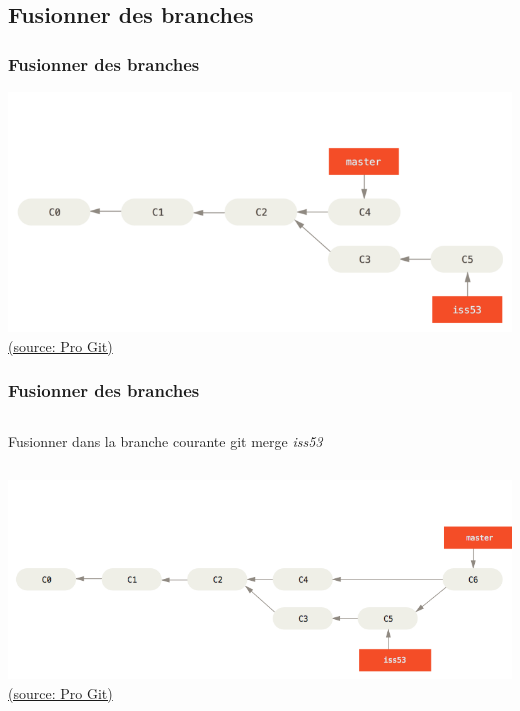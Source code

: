\documentclass[t,11pt]{beamer}
\begin{document}
\subsection{Fusionner des branches}

\begin{frame}
        \frametitle{Fusionner des branches}
        \centering
        \includegraphics[width=\linewidth,height=0.8\textheight,keepaspectratio]{./img/basic-branching-6}
        \newline
        \href{https://git-scm.com/book/fr/v1/Les-branches-avec-Git-Ce-qu-est-une-branche}{{\tiny (source: Pro Git)}}
\end{frame}

\begin{frame}
        \frametitle{Fusionner des branches}
        \begin{columns}
                \begin{block}{Fusionner dans la branche courante}
                        git merge \emph{iss53}
                \end{block}
        \end{columns}
        \vspace{-5mm}
        \centering
        \includegraphics[width=\linewidth,height=0.8\textheight,keepaspectratio]{./img/basic-merging-2}
        \newline
        \href{https://git-scm.com/book/fr/v1/Les-branches-avec-Git-Ce-qu-est-une-branche}{{\tiny (source: Pro Git)}}
\end{frame}
\end{document}
